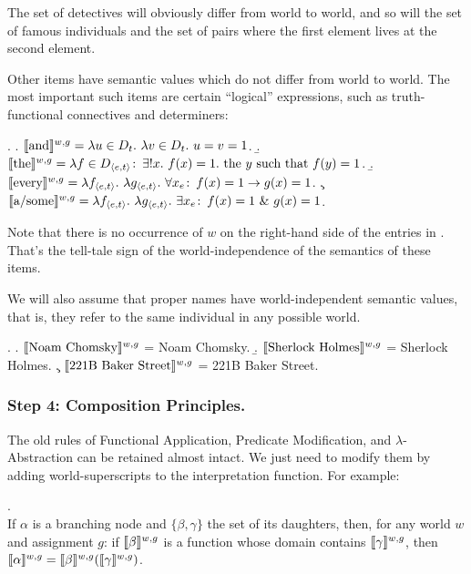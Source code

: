 The set of detectives will obviously differ from world to world, and
so will the set of famous individuals and the set of pairs where the
first element lives at the second element.

Other items have semantic values which do not differ from world to
world. The most important such items are certain ``logical''
expressions, such as truth-functional connectives and
determiners:

\ex. \a.
$\llbracket \mbox{and} \rrbracket^{w,g} = \lambda u \in D_t.\ \lambda v \in D_t.\ u=v=1
$.
\b.
$\llbracket \mbox{the} \rrbracket^{w,g} = \lambda f \in D_{\langle e,t \rangle}\colon\thinspace \exists !
x.\ f(x) = 1. \mbox{ the } y \mbox{ such that } f(y) = 1$.
\b.
$\llbracket \mbox{every} \rrbracket^{w,g} = \lambda f_{\langle e,t \rangle}.\ \lambda
g_{\langle e,t \rangle}.\ \forall x_e\colon\thinspace f(x) = 1 \rightarrow g(x) = 1 $.
 \c.
$\llbracket \mbox{a/some} \rrbracket^{w,g} = \lambda f_{\langle e,t \rangle}.\ \lambda
g_{\langle e,t \rangle}.\ \exists x_e\colon\thinspace f(x) = 1\ \&\ g(x) = 1 $.

Note that there is no occurrence of $w$ on the right-hand side of the
entries in \Last. That's the tell-tale sign of the world-independence
of the semantics of these items.

We will also assume that proper names have world-independent semantic
values, that is, they refer to the same individual in any possible
world.

\ex. \a. $\llbracket \mbox{Noam Chomsky} \rrbracket^{w,g}$ = Noam Chomsky. 
\b. $\llbracket \mbox{Sherlock Holmes} \rrbracket^{w,g}$ = Sherlock Holmes. 
\c. $\llbracket \mbox{221B Baker Street} \rrbracket^{w,g}$ = 221B Baker Street.

\subsubsection{Step 4: Composition Principles.} \label{sec:comp-princ}

The old rules of Functional Application, Predicate Modification, and
$\lambda$-Abstraction can be retained almost intact. We just need to
modify them by adding world-superscripts to the interpretation
function. For example:

\ex. \\
If $\alpha$ is a branching node and $\{\beta, \gamma\}$ the set of its
daughters, then, for any world $w$ and assignment $g$: if
$\llbracket \beta \rrbracket^{w,g}$ is a function whose domain contains
$\llbracket \gamma \rrbracket^{w,g}$, then
$\llbracket \alpha \rrbracket^{w,g} = \llbracket \beta \rrbracket^{w,g} (\llbracket \gamma \rrbracket^{w,g})$.

